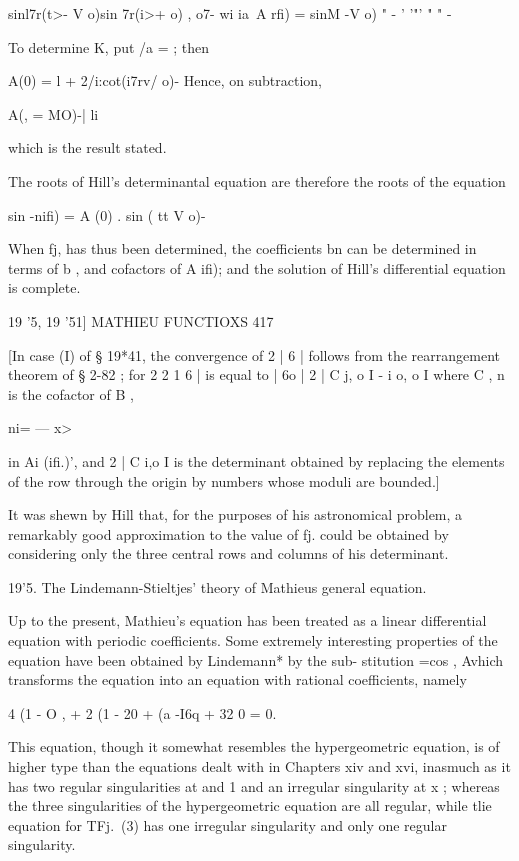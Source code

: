 sinl7r(t>- V o)sin 7r(i>+\/ o) , o7- wi ia\ 
A  rfi) =   sinM -V o) "  - ' '"'  "  " - 

To determine K, put /a = ; then 

A(0) = l + 2/i:cot(i7rv/ o)- 
Hence, on subtraction, 

A(,  = MO)-| li  

which is the result stated. 

The roots of Hill's determinantal equation are therefore the roots of the 
equation 

sin    -nifi) = A (0) . sin  ( tt V o)- 

When fj, has thus been determined, the coefficients bn can be determined 
in terms of b , and cofactors of A  ifi); and the solution of Hill's differential 
equation is complete. 



19 '5, 19 '51] MATHIEU FUNCTIOXS 417 

[In case (I) of § 19*41, the convergence of 2 | 6  | follows from the rearrangement theorem 
of § 2-82 ; for 2 2 1 6  | is equal to | 6o | 2 | C j, o I -  i  o, o I   where C , n is the cofactor of B ,   

ni= — x> 

in Ai (ifi.)', and 2 | C i,o I is the determinant obtained by replacing the elements of the row 
through the origin by numbers whose moduli are bounded.] 

It was shewn by Hill that, for the purposes of his astronomical problem, a remarkably 
good approximation to the value of fj. could be obtained by considering only the three 
central rows and columns of his determinant. 

19'5. The Lindemann-Stieltjes' theory of Mathieus general equation. 

Up to the present, Mathieu's equation has been treated as a linear 
differential equation with periodic coefficients. Some extremely interesting 
properties of the equation have been obtained by Lindemann* by the sub- 
stitution  =cos , Avhich transforms the equation into an equation with 
rational coefficients, namely 

4 (1 - O  , + 2 (1 - 20   + (a -I6q + 32 0   = 0. 

This equation, though it somewhat resembles the hypergeometric equation, is of higher 
type than the equations dealt with in Chapters xiv and xvi, inasmuch as it has two 
regular singularities at and 1 and an irregular singularity at x ; whereas the three 
singularities of the hypergeometric equation are all regular, while tlie equation for TFj.\  (3) 
has one irregular singularity and only one regular singularity. 

